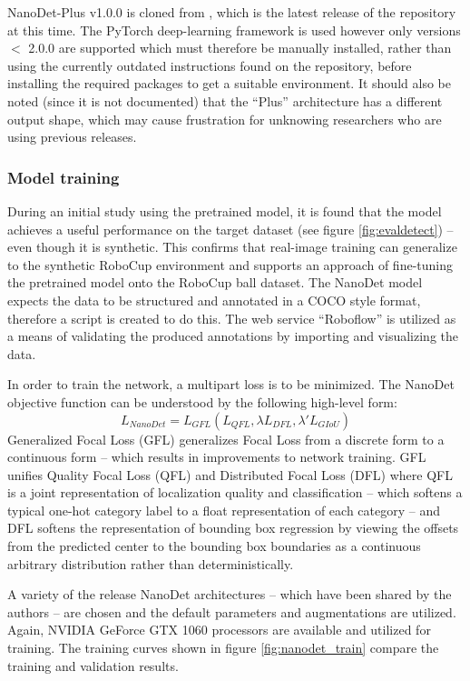 \documentclass[a4paper,twoside,12pt]{report}
\begin{document}
NanoDet-Plus v1.0.0 is cloned from \cite{nanodet}, which is the latest release of the repository at this time. The PyTorch deep-learning framework is used however only versions $<$ 2.0.0 are supported which must therefore be manually installed, rather than using the currently outdated instructions found on the repository, before installing the required packages to get a suitable environment. It should also be noted (since it is not documented) that the ``Plus'' architecture has a different output shape, which may cause frustration for unknowing researchers who are using previous releases.

\subsubsection{Model training}

During an initial study using the pretrained model, it is found that the model achieves a useful performance on the target dataset (see figure \ref{fig:evaldetect}) -- even though it is synthetic. This confirms that real-image training can generalize to the synthetic RoboCup environment and supports an approach of fine-tuning the pretrained model onto the RoboCup ball dataset. The NanoDet model expects the data to be structured and annotated in a COCO style format, therefore a script is created to do this. The web service ``Roboflow'' \citep{roboflow} is utilized as a means of validating the produced annotations by importing and visualizing the data. 

In order to train the network, a multipart loss is to be minimized. The NanoDet objective function can be understood by the following high-level form:
\begin{equation}
L_{NanoDet} =  L_{GFL}(L_{QFL}, \lambda L_{DFL}, \lambda' L_{GIoU})
\end{equation} 
Generalized Focal Loss (GFL) \citep{gflloss} generalizes Focal Loss from a discrete form to a continuous form -- which results in improvements to network training. GFL unifies Quality Focal Loss (QFL) and Distributed Focal Loss (DFL) where QFL is a joint representation of localization quality and classification -- which softens a typical one-hot category label to a float representation of each category -- and DFL softens the representation of bounding box regression by viewing the offsets from the predicted center to the bounding box boundaries as a continuous arbitrary distribution rather than deterministically.

A variety of the release NanoDet architectures -- which have been shared by the authors -- are chosen and the default parameters and augmentations are utilized. Again, NVIDIA GeForce GTX 1060 processors are available and utilized for training. The training curves shown in figure \ref{fig:nanodet_train} compare the training and validation results.
\end{document}
